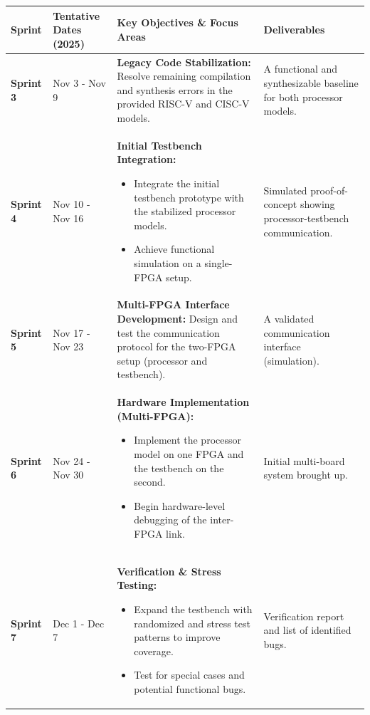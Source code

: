 \documentclass[10pt]{article}
\begin{document}
\begin{table}[h!]
\centering
\begin{tabular}{@{}llp{6cm}p{5cm}@{}}
\toprule
\textbf{Sprint} & \textbf{Tentative Dates (2025)} & \textbf{Key Objectives \& Focus Areas} & \textbf{Deliverables} \\
\midrule
\textbf{Sprint 3} & Nov 3 - Nov 9 & \textbf{Legacy Code Stabilization:} \newline Resolve remaining compilation and synthesis errors in the provided RISC-V and CISC-V models. & A functional and synthesizable baseline for both processor models. \\
\addlinespace
\textbf{Sprint 4} & Nov 10 - Nov 16 & \textbf{Initial Testbench Integration:} \newline \begin{itemize} \itemsep0em \item Integrate the initial testbench prototype with the stabilized processor models. \item Achieve functional simulation on a single-FPGA setup. \end{itemize} & Simulated proof-of-concept showing processor-testbench communication. \\
\addlinespace
\textbf{Sprint 5} & Nov 17 - Nov 23 & \textbf{Multi-FPGA Interface Development:} \newline Design and test the communication protocol for the two-FPGA setup (processor and testbench). & A validated communication interface (simulation). \\
\addlinespace
\textbf{Sprint 6} & Nov 24 - Nov 30 & \textbf{Hardware Implementation (Multi-FPGA):} \newline \begin{itemize} \itemsep0em \item Implement the processor model on one FPGA and the testbench on the second. \item Begin hardware-level debugging of the inter-FPGA link. \end{itemize} & Initial multi-board system brought up. \\
\addlinespace
\textbf{Sprint 7} & Dec 1 - Dec 7 & \textbf{Verification \& Stress Testing:} \newline \begin{itemize} \itemsep0em \item Expand the testbench with randomized and stress test patterns to improve coverage. \item Test for special cases and potential functional bugs. \end{itemize} & Verification report and list of identified bugs. \\

\end{tabular}
\end{table}
\end{document}
